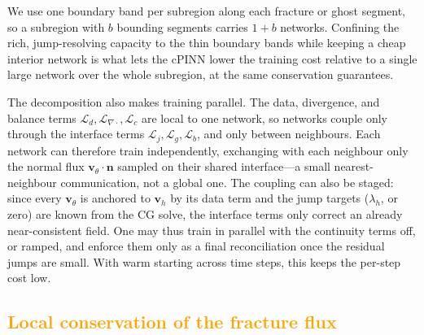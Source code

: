 \documentclass[a4paper,fleqn]{cas-sc}
\newcommand{\vflux}{\mathbf{v}}
\begin{document}
We use one boundary band per subregion along each fracture or ghost segment, so a
subregion with \(b\) bounding segments carries \(1+b\) networks. Confining
the rich, jump-resolving capacity to the thin boundary bands while keeping a cheap
interior network is what lets the cPINN lower the training cost relative to a
single large network over the whole subregion, at the same conservation
guarantees.

The decomposition also makes training parallel. The data, divergence, and balance
terms \(\mathcal{L}_d,\mathcal{L}_{\nabla\cdot},\mathcal{L}_c\) are local to one
network, so networks couple only through the interface terms
\(\mathcal{L}_j,\mathcal{L}_g,\mathcal{L}_b\), and only between neighbours. Each
network can therefore train independently, exchanging with each neighbour only the
normal flux \(\vflux_\theta\cdot\mathbf{n}\) sampled on their shared interface---a
small nearest-neighbour communication, not a global one. The coupling can also be staged: since every
\(\vflux_\theta\) is anchored to \(\vflux_h\) by its data term and the jump targets
(\(\lambda_h\), or zero) are known from the CG solve, the interface terms only
correct an already near-consistent field. One may thus train in parallel with the
continuity terms off, or ramped, and enforce them only as a final reconciliation
once the residual jumps are small. With warm starting across time steps, this
keeps the per-step cost low.

\subsection{\textcolor{orange}{Local conservation of the fracture flux}}
\label{subsec:fracture-flux}
\end{document}
